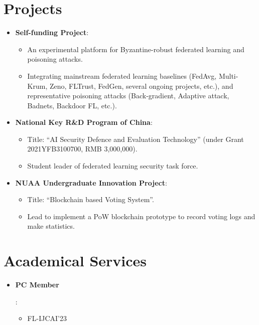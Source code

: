 \documentclass[letterpaper,11pt]{article}
\newcommand{\resumeItem}[2]{
  \item\small{
    \textbf{#1}{: #2 \vspace{-2pt}}
  }
}
\newcommand{\resumeSubItem}[2]{\resumeItem{#1}{#2}\vspace{-4pt}}
\newcommand{\resumeSubHeadingListStart}{\begin{itemize}[leftmargin=*]}
\newcommand{\resumeSubHeadingListEnd}{\end{itemize}}
\begin{document}
\section{Projects}
  \resumeSubHeadingListStart
    \resumeSubItem{Self-funding Project}\hfill{2020.01 -- , host, ongoing}
      {
        \begin{itemize}
          \item An experimental platform for Byzantine-robust federated learning and poisoning attacks.
          \item Integrating mainstream federated learning baselines (FedAvg, Multi-Krum, Zeno, FLTrust, FedGen, several ongoing projects, etc.), and representative poisoning attacks (Back-gradient, Adaptive attack, Badnets, Backdoor FL, etc.).
        \end{itemize}
      }
    \resumeSubItem{National Key R\&D Program of China}\hfill{2021.12 -- 2024.11, participant, ongoing}
      {
        \begin{itemize}
          \item Title: ``AI Security Defence and Evaluation Technology'' (under Grant 2021YFB3100700, RMB 3,000,000).
          \item Student leader of federated learning security task force.
        \end{itemize}
      }
    \resumeSubItem{NUAA Undergraduate Innovation Project}\hfill{2017.12 -- 2018.05, principal participant, accomplished}
    {
        \begin{itemize}
          \item Title: ``Blockchain based Voting System''.
          \item Lead to implement a PoW blockchain prototype to record voting logs and make statistics.
        \end{itemize}
    }
  \resumeSubHeadingListEnd


\section{Academical Services}
	\resumeSubHeadingListStart
		\resumeSubItem{PC Member}
		{
			\begin{itemize}
				\item FL-IJCAI'23
			\end{itemize}
		}
	\resumeSubHeadingListEnd
\end{document}
